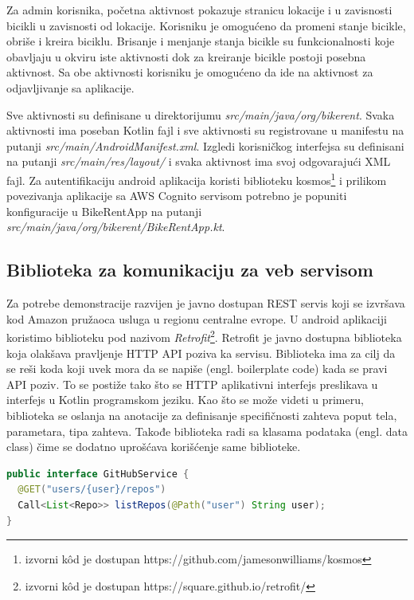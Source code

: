 \documentclass[12pt,oneside]{memoir}
\begin{document}
Za admin korisnika, početna aktivnost pokazuje stranicu lokacije i u zavisnosti bicikli u zavisnosti od lokacije. Korisniku je omogućeno da promeni stanje bicikle, obriše i kreira biciklu. Brisanje i menjanje stanja bicikle su funkcionalnosti koje obavljaju u okviru iste aktivnosti dok za kreiranje bicikle postoji posebna aktivnost. Sa obe aktivnosti korisniku je omogućeno da ide na aktivnost za odjavljivanje sa aplikacije.
 
Sve aktivnosti su definisane u direktorijumu \emph{src/main/java/org/bikerent}. Svaka aktivnosti ima poseban Kotlin fajl i sve aktivnosti su registrovane u manifestu na putanji \emph{src/main/AndroidManifest.xml}. Izgledi korisničkog interfejsa su definisani na putanji \emph{src/main/res/layout/} i svaka aktivnost ima svoj odgovarajući XML fajl. Za autentifikaciju android aplikacija koristi biblioteku kosmos\footnote{izvorni kôd je dostupan https://github.com/jamesonwilliams/kosmos} i prilikom povezivanja aplikacije sa AWS Cognito servisom potrebno je popuniti konfiguracije u BikeRentApp na putanji \emph{src/main/java/org/bikerent/BikeRentApp.kt}.
 
\subsection{Biblioteka za komunikaciju za veb servisom}
 
Za potrebe demonstracije razvijen je javno dostupan REST servis koji se izvršava kod Amazon pružaoca usluga u regionu centralne evrope. U android aplikaciji koristimo biblioteku pod nazivom \emph{Retrofit}\footnote{izvorni kôd je dostupan https://square.github.io/retrofit/}. Retrofit je javno dostupna biblioteka koja olakšava pravljenje HTTP API poziva ka servisu. Biblioteka ima za cilj da se reši koda koji uvek mora da se napiše (engl. boilerplate code) kada se pravi API poziv. To se postiže tako što se HTTP aplikativni interfejs preslikava u interfejs u Kotlin programskom jeziku. Kao što se može videti u primeru, biblioteka se oslanja na anotacije za definisanje specifičnosti zahteva poput tela, parametara, tipa zahteva. Takođe biblioteka radi sa klasama podataka (engl. data class) čime se dodatno uprošćava korišćenje same biblioteke.

\begin{lstlisting}[caption={Interfejs za izvršavanje GET API poziva},captionpos=t, language=Java]
public interface GitHubService {
  @GET("users/{user}/repos")
  Call<List<Repo>> listRepos(@Path("user") String user);
}
\end{lstlisting}
\end{document}
